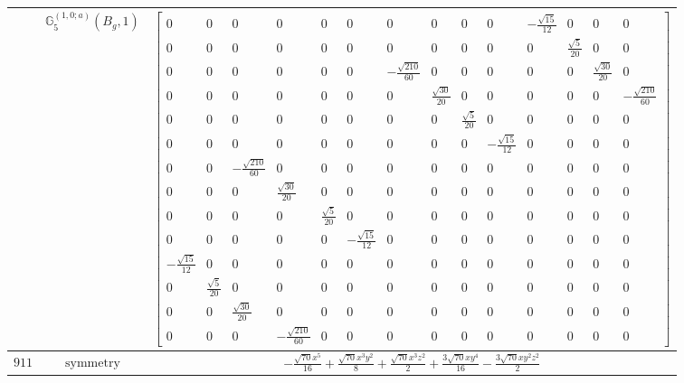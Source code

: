 \documentclass[fleqn,8pt,landscape]{jsarticle}
\begin{document}
\begin{longtable}{ccc}
$  $ & $ \mathbb{G}_{5}^{(1,0;a)}(B_{g},1) $ & $ \begin{bmatrix} 0 & 0 & 0 & 0 & 0 & 0 & 0 & 0 & 0 & 0 & - \frac{\sqrt{15}}{12} & 0 & 0 & 0 \\ 0 & 0 & 0 & 0 & 0 & 0 & 0 & 0 & 0 & 0 & 0 & \frac{\sqrt{5}}{20} & 0 & 0 \\ 0 & 0 & 0 & 0 & 0 & 0 & - \frac{\sqrt{210}}{60} & 0 & 0 & 0 & 0 & 0 & \frac{\sqrt{30}}{20} & 0 \\ 0 & 0 & 0 & 0 & 0 & 0 & 0 & \frac{\sqrt{30}}{20} & 0 & 0 & 0 & 0 & 0 & - \frac{\sqrt{210}}{60} \\ 0 & 0 & 0 & 0 & 0 & 0 & 0 & 0 & \frac{\sqrt{5}}{20} & 0 & 0 & 0 & 0 & 0 \\ 0 & 0 & 0 & 0 & 0 & 0 & 0 & 0 & 0 & - \frac{\sqrt{15}}{12} & 0 & 0 & 0 & 0 \\ 0 & 0 & - \frac{\sqrt{210}}{60} & 0 & 0 & 0 & 0 & 0 & 0 & 0 & 0 & 0 & 0 & 0 \\ 0 & 0 & 0 & \frac{\sqrt{30}}{20} & 0 & 0 & 0 & 0 & 0 & 0 & 0 & 0 & 0 & 0 \\ 0 & 0 & 0 & 0 & \frac{\sqrt{5}}{20} & 0 & 0 & 0 & 0 & 0 & 0 & 0 & 0 & 0 \\ 0 & 0 & 0 & 0 & 0 & - \frac{\sqrt{15}}{12} & 0 & 0 & 0 & 0 & 0 & 0 & 0 & 0 \\ - \frac{\sqrt{15}}{12} & 0 & 0 & 0 & 0 & 0 & 0 & 0 & 0 & 0 & 0 & 0 & 0 & 0 \\ 0 & \frac{\sqrt{5}}{20} & 0 & 0 & 0 & 0 & 0 & 0 & 0 & 0 & 0 & 0 & 0 & 0 \\ 0 & 0 & \frac{\sqrt{30}}{20} & 0 & 0 & 0 & 0 & 0 & 0 & 0 & 0 & 0 & 0 & 0 \\ 0 & 0 & 0 & - \frac{\sqrt{210}}{60} & 0 & 0 & 0 & 0 & 0 & 0 & 0 & 0 & 0 & 0 \end{bmatrix} $ \\ \hline
$ 911 $ & $ \text{symmetry} $ & $ - \frac{\sqrt{70} x^{5}}{16} + \frac{\sqrt{70} x^{3} y^{2}}{8} + \frac{\sqrt{70} x^{3} z^{2}}{2} + \frac{3 \sqrt{70} x y^{4}}{16} - \frac{3 \sqrt{70} x y^{2} z^{2}}{2} $ \\

\end{longtable}
\end{document}
